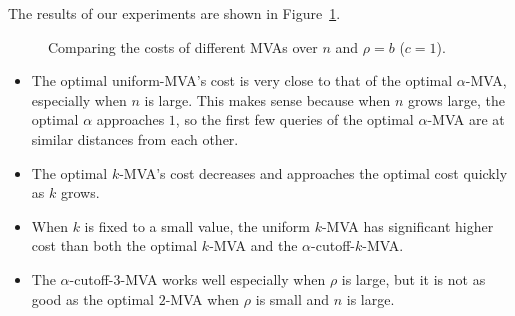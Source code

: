 The results of our experiments are shown in Figure~\ref{fig:cost_comparisons}.
\begin{figure}
\centering
    \caption{Comparing the costs of different MVAs over $n$ and $\rho = b$ ($c=1$).}
    \label{fig:cost_comparisons}
\end{figure}
\begin{itemize}
\item 
The optimal uniform-MVA's cost is very close to that of the optimal $\alpha$-MVA,
especially when $n$ is large. This makes sense because when $n$ grows
large, the optimal $\alpha$ approaches $1$, so the first few queries of
the optimal $\alpha$-MVA are at similar distances from each other.
%
\item The optimal $k$-MVA's cost decreases and approaches the optimal cost quickly
as $k$ grows.
\item When $k$ is fixed to a small value, 
the uniform $k$-MVA  has significant higher cost than both the optimal
$k$-MVA and the $\alpha$-cutoff-$k$-MVA.
\item The $\alpha$-cutoff-$3$-MVA works well especially when
$\rho$ is large,
but it is not
as good as  the optimal $2$-MVA when $\rho$ is small and $n$ is large. 
\end{itemize}
